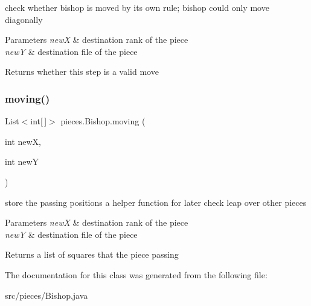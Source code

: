 check whether bishop is moved by its own rule; bishop could only move diagonally 
\begin{DoxyParams}{Parameters}
{\em newX} & destination rank of the piece \\
\hline
{\em newY} & destination file of the piece \\
\hline
\end{DoxyParams}
\begin{DoxyReturn}{Returns}
whether this step is a valid move 
\end{DoxyReturn}
\mbox{\label{classpieces_1_1_bishop_a3bdcfb9a3b44569aee1d5d4e5aa7333d}} 
\subsubsection{\texorpdfstring{moving()}{moving()}}
{\footnotesize\ttfamily List$<$int\mbox{[}$\,$\mbox{]}$>$ pieces.\+Bishop.\+moving (\begin{DoxyParamCaption}\item[{int}]{newX,  }\item[{int}]{newY }\end{DoxyParamCaption})\hspace{0.3cm}{\ttfamily [inline]}}

store the passing positions a helper function for later check leap over other pieces 
\begin{DoxyParams}{Parameters}
{\em newX} & destination rank of the piece \\
\hline
{\em newY} & destination file of the piece \\
\hline
\end{DoxyParams}
\begin{DoxyReturn}{Returns}
a list of squares that the piece passing 
\end{DoxyReturn}


The documentation for this class was generated from the following file\+:\begin{DoxyCompactItemize}
\item 
src/pieces/Bishop.\+java\end{DoxyCompactItemize}
